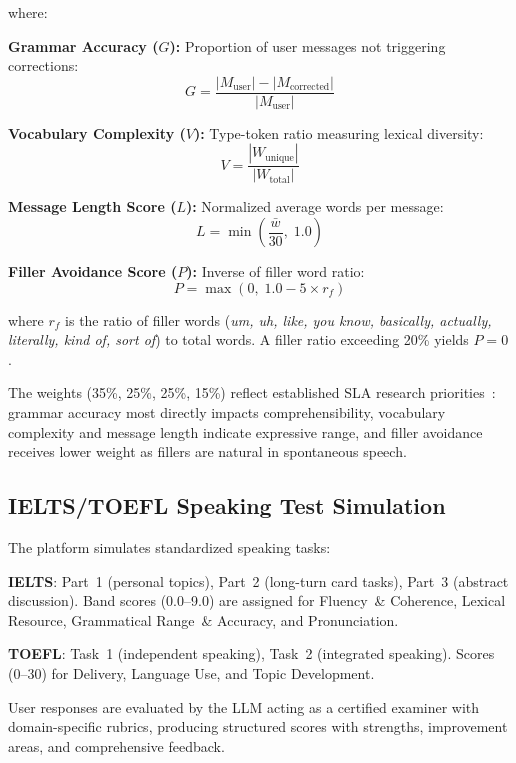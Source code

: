 \documentclass[conference]{IEEEtran}
\begin{document}
where:

\textbf{Grammar Accuracy ($G$):} Proportion of user messages not triggering corrections:
\begin{equation}
G = \frac{|M_{\text{user}}| - |M_{\text{corrected}}|}{|M_{\text{user}}|}
\end{equation}

\textbf{Vocabulary Complexity ($V$):} Type-token ratio measuring lexical diversity:
\begin{equation}
V = \frac{|W_{\text{unique}}|}{|W_{\text{total}}|}
\end{equation}

\textbf{Message Length Score ($L$):} Normalized average words per message:
\begin{equation}
L = \min\left(\frac{\bar{w}}{30}, \; 1.0\right)
\end{equation}

\textbf{Filler Avoidance Score ($P$):} Inverse of filler word ratio:
\begin{equation}
P = \max(0, \; 1.0 - 5 \times r_f)
\end{equation}

where $r_f$ is the ratio of filler words (\textit{um, uh, like, you know, basically, actually, literally, kind of, sort of}) to total words. A filler ratio exceeding 20\% yields $P{=}0$.

The weights (35\%, 25\%, 25\%, 15\%) reflect established SLA research priorities~\cite{crossley2016, ortega2003}: grammar accuracy most directly impacts comprehensibility, vocabulary complexity and message length indicate expressive range, and filler avoidance receives lower weight as fillers are natural in spontaneous speech.

\subsection{IELTS/TOEFL Speaking Test Simulation}

The platform simulates standardized speaking tasks:

\textbf{IELTS}: Part~1 (personal topics), Part~2 (long-turn card tasks), Part~3 (abstract discussion). Band scores (0.0--9.0) are assigned for Fluency~\& Coherence, Lexical Resource, Grammatical Range~\& Accuracy, and Pronunciation.

\textbf{TOEFL}: Task~1 (independent speaking), Task~2 (integrated speaking). Scores (0--30) for Delivery, Language Use, and Topic Development.

User responses are evaluated by the LLM acting as a certified examiner with domain-specific rubrics, producing structured scores with strengths, improvement areas, and comprehensive feedback.
\end{document}
